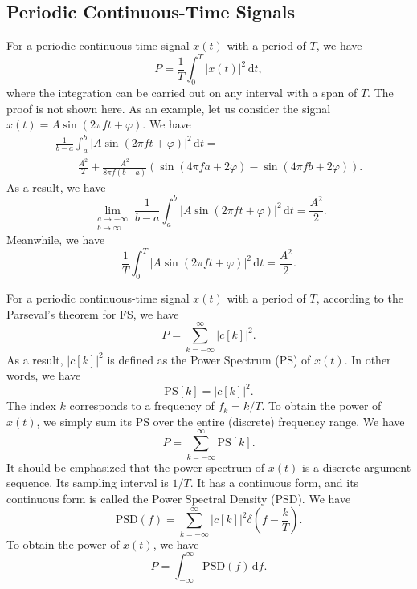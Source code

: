 \documentclass[journal,twoside]{IEEEtran}
\newcommand{\dd}{\,\mathrm{d}}
\begin{document}
\subsection{Periodic Continuous-Time Signals}

For a periodic continuous-time signal $x(t)$ with a period of $T$, we have
\begin{equation}
P = \frac{1}{T}\int_{0}^{T}|x(t)|^2\dd t,
\end{equation}
where the integration can be carried out on any interval with a span of $T$. The proof is not shown here. As an example, let us consider the signal $x(t) = A \sin(2 \pi f t + \varphi)$. We have
\begin{multline}
\frac{1}{b-a}\int_{a}^{b}|A \sin(2 \pi f t + \varphi)|^2\dd t = \\
\qquad \frac{A^2}{2}+\frac{A^2}{8 \pi f (b-a)}(\sin(4 \pi f a + 2 \varphi) - \sin(4 \pi f b + 2 \varphi)).
\end{multline}
As a result, we have
\begin{equation}
\lim_{\substack{a\rightarrow -\infty\\b\rightarrow \infty}}\frac{1}{b-a}\int_{a}^{b}|A \sin(2 \pi f t + \varphi)|^2\dd t = \frac{A^2}{2}.
\end{equation}
Meanwhile, we have
\begin{equation}
\frac{1}{T}\int_{0}^{T}|A \sin(2 \pi f t + \varphi)|^2\dd t = \frac{A^2}{2}.
\end{equation}

For a periodic continuous-time signal $x(t)$ with a period of $T$, according to the Parseval's theorem for FS, we have
\begin{equation}
P = \sum_{k=-\infty}^{\infty}|c[k]|^2.
\end{equation}
As a result, $|c[k]|^2$ is defined as the Power Spectrum (PS) of $x(t)$. In other words, we have
\begin{equation}
\mathrm{PS}[k] = |c[k]|^2.
\end{equation}
The index $k$ corresponds to a frequency of $f_{k} = k/T$. To obtain the power of $x(t)$, we simply sum its PS over the entire (discrete) frequency range. We have
\begin{equation}
P = \sum_{k=-\infty}^{\infty} \mathrm{PS}[k].
\end{equation}
It should be emphasized that the power spectrum of $x(t)$ is a discrete-argument sequence. Its sampling interval is $1/T$. It has a continuous form, and its continuous form is called the Power Spectral Density (PSD). We have
\begin{equation}
\mathrm{PSD}(f) = \sum_{k=-\infty}^{\infty} |c[k]|^2 \delta \left( f - \frac{k}{T} \right).\label{eqn:PSD_f_def}
\end{equation}
To obtain the power of $x(t)$, we have
\begin{equation}
P = \int_{-\infty}^{\infty} \mathrm{PSD}(f) \dd f.\label{eqn:PSD_f_to_P}
\end{equation}
\end{document}

